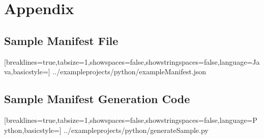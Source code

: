 \documentclass{article}
\begin{document}
\section{Appendix}
\subsection{Sample Manifest File}


[breaklines=true,tabsize=1,showspaces=false,showstringspaces=false,language=Java,basicstyle=\ttfamily\scriptsize]
{../exampleprojects/python/exampleManifest.json}

\subsection{Sample Manifest Generation Code}


[breaklines=true,tabsize=1,showspaces=false,showstringspaces=false,language=Python,basicstyle=\ttfamily\scriptsize]
{../exampleprojects/python/generateSample.py}
\end{document}
